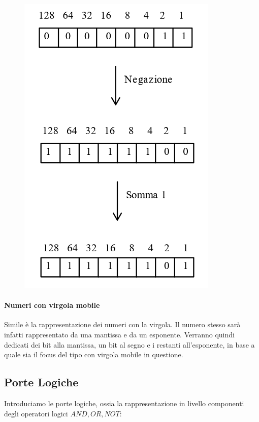 \documentclass{article}
\begin{document}
\begin{figure}[htbp]
    \center
    \includegraphics[scale=0.6]{img/complementoDue.png}
\end{figure}

\newpage

\paragraph{Numeri con virgola mobile}

Simile è la rappresentazione dei numeri con la virgola. Il numero stesso sarà infatti rappresentato da una mantissa e da un esponente. Verranno quindi dedicati dei bit alla mantissa, un bit al segno e i restanti all'esponente, in base a quale sia il focus del tipo con virgola mobile in questione.

\subsection{Porte Logiche}

Introduciamo le porte logiche, ossia la rappresentazione in livello componenti degli operatori logici $AND, OR, NOT$:
\end{document}
